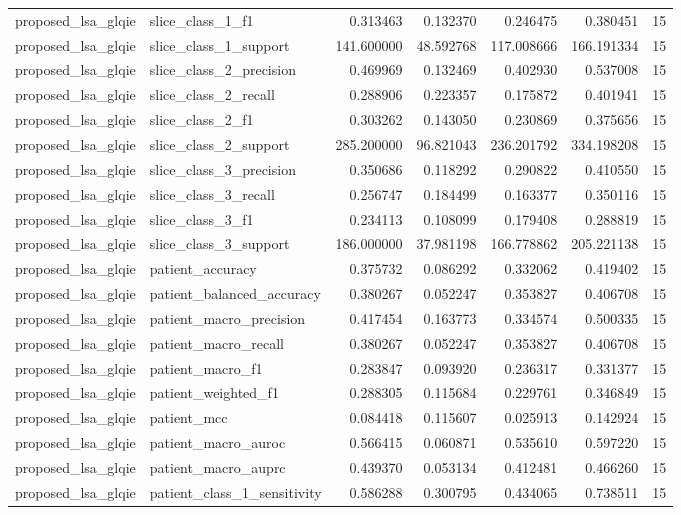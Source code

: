\begin{tabular}{llrrrrr}
proposed_lsa_glqie & slice_class_1_f1 & 0.313463 & 0.132370 & 0.246475 & 0.380451 & 15 \\
proposed_lsa_glqie & slice_class_1_support & 141.600000 & 48.592768 & 117.008666 & 166.191334 & 15 \\
proposed_lsa_glqie & slice_class_2_precision & 0.469969 & 0.132469 & 0.402930 & 0.537008 & 15 \\
proposed_lsa_glqie & slice_class_2_recall & 0.288906 & 0.223357 & 0.175872 & 0.401941 & 15 \\
proposed_lsa_glqie & slice_class_2_f1 & 0.303262 & 0.143050 & 0.230869 & 0.375656 & 15 \\
proposed_lsa_glqie & slice_class_2_support & 285.200000 & 96.821043 & 236.201792 & 334.198208 & 15 \\
proposed_lsa_glqie & slice_class_3_precision & 0.350686 & 0.118292 & 0.290822 & 0.410550 & 15 \\
proposed_lsa_glqie & slice_class_3_recall & 0.256747 & 0.184499 & 0.163377 & 0.350116 & 15 \\
proposed_lsa_glqie & slice_class_3_f1 & 0.234113 & 0.108099 & 0.179408 & 0.288819 & 15 \\
proposed_lsa_glqie & slice_class_3_support & 186.000000 & 37.981198 & 166.778862 & 205.221138 & 15 \\
proposed_lsa_glqie & patient_accuracy & 0.375732 & 0.086292 & 0.332062 & 0.419402 & 15 \\
proposed_lsa_glqie & patient_balanced_accuracy & 0.380267 & 0.052247 & 0.353827 & 0.406708 & 15 \\
proposed_lsa_glqie & patient_macro_precision & 0.417454 & 0.163773 & 0.334574 & 0.500335 & 15 \\
proposed_lsa_glqie & patient_macro_recall & 0.380267 & 0.052247 & 0.353827 & 0.406708 & 15 \\
proposed_lsa_glqie & patient_macro_f1 & 0.283847 & 0.093920 & 0.236317 & 0.331377 & 15 \\
proposed_lsa_glqie & patient_weighted_f1 & 0.288305 & 0.115684 & 0.229761 & 0.346849 & 15 \\
proposed_lsa_glqie & patient_mcc & 0.084418 & 0.115607 & 0.025913 & 0.142924 & 15 \\
proposed_lsa_glqie & patient_macro_auroc & 0.566415 & 0.060871 & 0.535610 & 0.597220 & 15 \\
proposed_lsa_glqie & patient_macro_auprc & 0.439370 & 0.053134 & 0.412481 & 0.466260 & 15 \\
proposed_lsa_glqie & patient_class_1_sensitivity & 0.586288 & 0.300795 & 0.434065 & 0.738511 & 15 \\

\end{tabular}
